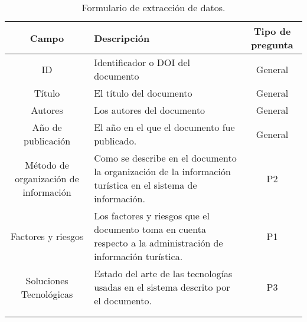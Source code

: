 \begin{xltabular}{\textwidth}{C{0.5} L{2} C{0.5}}
    \toprule
    Campo & Descripción & Tipo de pregunta \\
    \midrule
    ID & Identificador o DOI del documento & General \\
    \midrule
    Título & El título del documento & General \\
    \midrule
    Autores & Los autores del documento & General \\
    \midrule
    Año de publicación & El año en el que el documento fue publicado. & General \\
    \midrule
    Método de organización de información & Como se describe en el documento la organización de la información turística en el sistema de información. & P2 \\
    \midrule
    Factores y riesgos & Los factores y riesgos que el documento toma en cuenta respecto a la administración de información turística. & P1 \\
    \midrule
    Soluciones Tecnológicas & Estado del arte de las tecnologías usadas en el sistema descrito por el documento. & P3 \\
    \bottomrule
    \\
    \caption{Formulario de extracción de datos.}\label{table:extracion_datos} \\
\end{xltabular}

